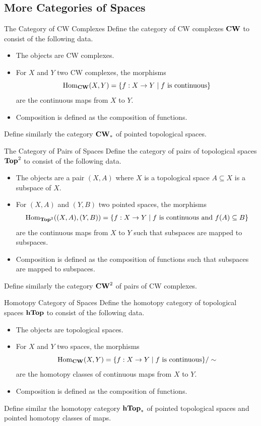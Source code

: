 \documentclass[a4paper]{article}
\begin{document}
\subsection{More Categories of Spaces}
\begin{defn}{The Category of CW Complexes}{} Define the category of CW complexes $\bold{CW}$ to consist of the following data. 
\begin{itemize}
\item The objects are CW complexes. 
\item For $X$ and $Y$ two CW complexes, the morphisms $$\operatorname{Hom}_{\bold{CW}}(X,Y)=\{f:X\to Y\;|\;f\text{ is continuous}\}$$ are the continuous maps from $X$ to $Y$. 
\item Composition is defined as the composition of functions. 
\end{itemize}
Define similarly the category $\bold{CW}_\ast$ of pointed topological spaces. 
\end{defn}

\begin{defn}{The Category of Pairs of Spaces}{} Define the category of pairs of topological spaces $\bold{Top}^2$ to consist of the following data. 
\begin{itemize}
\item The objects are a pair $(X,A)$ where $X$ is a topological space $A\subseteq X$ is a subspace of $X$. 
\item For $(X,A)$ and $(Y,B)$ two pointed spaces, the morphisms $$\operatorname{Hom}_{\bold{Top}^2}((X,A),(Y,B))=\{f:X\to Y\;|\;f\text{ is continuous and }f(A)\subseteq B\}$$ are the continuous maps from $X$ to $Y$ such that subspaces are mapped to subspaces. 
\item Composition is defined as the composition of functions such that subspaces are mapped to subspaces. 
\end{itemize}
Define similarly the category $\bold{CW}^2$ of pairs of CW complexes. 
\end{defn}

\begin{defn}{Homotopy Category of Spaces}{} Define the homotopy category of topological spaces $\bold{hTop}$ to consist of the following data. 
\begin{itemize}
\item The objects are topological spaces. 
\item For $X$ and $Y$ two spaces, the morphisms $$\operatorname{Hom}_{\bold{CW}}(X,Y)=\{f:X\to Y\;|\;f\text{ is continuous}\}/\sim$$ are the homotopy classes of continuous maps from $X$ to $Y$. 
\item Composition is defined as the composition of functions. 
\end{itemize}
Define similar the homotopy category $\bold{hTop}_\ast$ of pointed topological spaces and pointed homotopy classes of maps. 
\end{defn}
\end{document}
